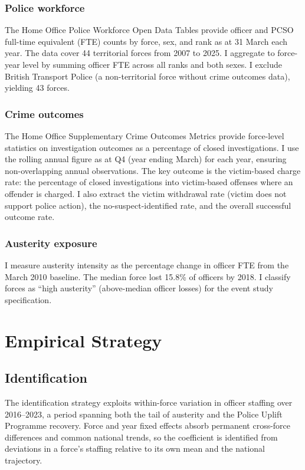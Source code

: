 \documentclass[12pt]{article}
\begin{document}
\subsubsection*{Police workforce}  The Home Office Police Workforce Open Data Tables provide officer and PCSO full-time equivalent (FTE) counts by force, sex, and rank as at 31 March each year. The data cover 44 territorial forces from 2007 to 2025. I aggregate to force-year level by summing officer FTE across all ranks and both sexes. I exclude British Transport Police (a non-territorial force without crime outcomes data), yielding 43 forces.

\subsubsection*{Crime outcomes}  The Home Office Supplementary Crime Outcomes Metrics provide force-level statistics on investigation outcomes as a percentage of closed investigations. I use the rolling annual figure as at Q4 (year ending March) for each year, ensuring non-overlapping annual observations. The key outcome is the victim-based charge rate: the percentage of closed investigations into victim-based offenses where an offender is charged. I also extract the victim withdrawal rate (victim does not support police action), the no-suspect-identified rate, and the overall successful outcome rate.

\subsubsection*{Austerity exposure}  I measure austerity intensity as the percentage change in officer FTE from the March 2010 baseline. The median force lost 15.8\% of officers by 2018. I classify forces as ``high austerity'' (above-median officer losses) for the event study specification.



\section{Empirical Strategy}

\subsection{Identification}

The identification strategy exploits within-force variation in officer staffing over 2016--2023, a period spanning both the tail of austerity and the Police Uplift Programme recovery. Force and year fixed effects absorb permanent cross-force differences and common national trends, so the coefficient is identified from deviations in a force's staffing relative to its own mean and the national trajectory.
\end{document}
